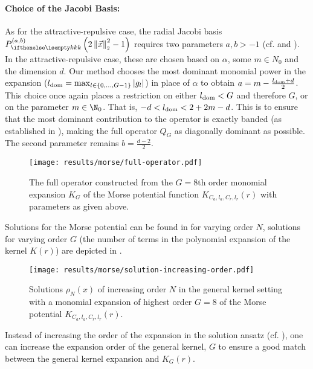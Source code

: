 \paragraph{Choice of the Jacobi Basis:}
As for the attractive-repulsive case, the radial Jacobi basis $\jacobi[k]{x}$ requires two parameters $a, b > -1$ (cf.  and ).
In the attractive-repulsive case, these are chosen based on $\alpha$, some $m \in N_0$ and the dimension $d$.
Our method chooses the most dominant monomial power in the expansion ($l_{\rm dom} = \max_{l \in \{0, ..., G-1\}} |g_l|$) in place of $\alpha$ to obtain $a = m - \frac{l_{\rm dom} + d}{2}$.
This choice once again places a restriction on either $l_{\rm dom} < G$ and therefore $G$, or on the parameter $m \in \N_0$.
That is, $-d < l_{\rm dom} < 2 + 2m - d$.
This is to ensure that the most dominant contribution to the operator is exactly banded (as established in ), making the full operator $Q_G$ as diagonally dominant as possible.
The second parameter remains $b = \frac{d-2}{2}$.

\begin{figure}[H]
  \centering
  \texttt{[image: results/morse/full-operator.pdf]}
  \caption[Full Morse operator]{The full operator constructed from the $G=8$th order monomial expansion $K_G$ of the Morse potential function $K_{C_a, l_a, C_r, l_r}(r)$ with parameters as given above.}
  \label{fig:morse-operator}
\end{figure}

Solutions for the Morse potential can be found in  for varying order $N$, solutions for varying order $G$ (the number of terms in the polynomial expansion of the kernel $K(r)$) are depicted in .

\begin{figure}[H]
  \centering
  \texttt{[image: results/morse/solution-increasing-order.pdf]}
  \caption[General kernel solutions of increasing order]{Solutions $\rho_N(x)$ of increasing order $N$ in the general kernel setting with a monomial expansion of highest order $G = 8$ of the Morse potential $K_{C_a, l_a, C_r, l_r}(r)$.}
  \label{fig:morse-solution-increasing-order}
\end{figure}

Instead of increasing the order of the expansion in the solution ansatz (cf. ), one can increase the expansion order of the general kernel, $G$ to ensure a good match between the general kernel expansion and $K_G(r)$.

